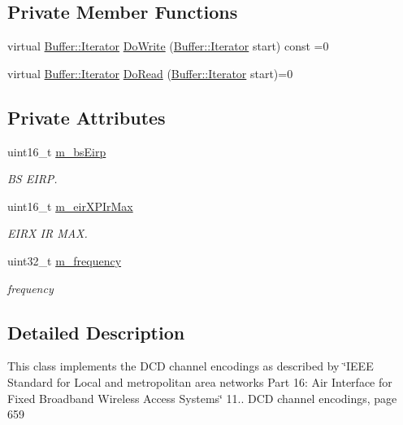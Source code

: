 \subsection*{Private Member Functions}
\begin{DoxyCompactItemize}
\item 
virtual \hyperlink{classns3_1_1Buffer_1_1Iterator}{Buffer\+::\+Iterator} \hyperlink{classns3_1_1DcdChannelEncodings_ac2cf65411d2c60fc8d31b0d18088d726}{Do\+Write} (\hyperlink{classns3_1_1Buffer_1_1Iterator}{Buffer\+::\+Iterator} start) const =0
\item 
virtual \hyperlink{classns3_1_1Buffer_1_1Iterator}{Buffer\+::\+Iterator} \hyperlink{classns3_1_1DcdChannelEncodings_ad7a1d57807bcdad38054fa98bc382db2}{Do\+Read} (\hyperlink{classns3_1_1Buffer_1_1Iterator}{Buffer\+::\+Iterator} start)=0
\end{DoxyCompactItemize}
\subsection*{Private Attributes}
\begin{DoxyCompactItemize}
\item 
uint16\+\_\+t \hyperlink{classns3_1_1DcdChannelEncodings_af64539862078bb209f64aecb59cfb2d5}{m\+\_\+bs\+Eirp}
\begin{DoxyCompactList}\small\item\em BS E\+I\+RP. \end{DoxyCompactList}\item 
uint16\+\_\+t \hyperlink{classns3_1_1DcdChannelEncodings_acb30ed5e9d84fd53149ce001691203bd}{m\+\_\+eir\+X\+P\+Ir\+Max}
\begin{DoxyCompactList}\small\item\em E\+I\+RX IR M\+AX. \end{DoxyCompactList}\item 
uint32\+\_\+t \hyperlink{classns3_1_1DcdChannelEncodings_a0547d47faca078341233de08bdafba97}{m\+\_\+frequency}
\begin{DoxyCompactList}\small\item\em frequency \end{DoxyCompactList}\end{DoxyCompactItemize}


\subsection{Detailed Description}
This class implements the D\+CD channel encodings as described by \char`\"{}\+I\+E\+E\+E Standard for
\+Local and metropolitan area networks Part 16\+: Air Interface for Fixed Broadband Wireless Access Systems\char`\"{} 11.. D\+CD channel encodings, page 659 

